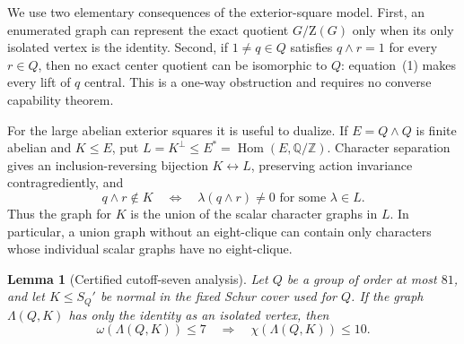 \documentclass[11pt]{article}
\newtheorem{lemma}[theorem]{Lemma}
\theoremstyle{remark}
\newcommand{\Z}{\mathrm Z}
\begin{document}
We use two elementary consequences of the exterior-square model.  First, an
enumerated graph can represent the exact quotient $G/\Z(G)$ only when its
only isolated vertex is the identity.  Second, if $1\ne q\in Q$ satisfies
$q\wedge r=1$ for every $r\in Q$, then no exact center quotient can be
isomorphic to $Q$: equation~(1) makes every lift of $q$ central.  This is a
one-way obstruction and requires no converse capability theorem.

For the large abelian exterior squares it is useful to dualize.  If
$E=Q\wedge Q$ is finite abelian and $K\le E$, put
$L=K^\perp\le E^*=\operatorname{Hom}(E,\mathbb Q/\mathbb Z)$.  Character
separation gives an inclusion-reversing bijection $K\leftrightarrow L$,
preserving action invariance contragrediently, and
\[
 q\wedge r\notin K
 \quad\Longleftrightarrow\quad
 \lambda(q\wedge r)\ne0\text{ for some }\lambda\in L.       \tag{4}
\]
Thus the graph for $K$ is the union of the scalar character graphs in $L$.
In particular, a union graph without an eight-clique can contain only
characters whose individual scalar graphs have no eight-clique.

\begin{lemma}[Certified cutoff-seven analysis]\label{lem:h7-enumeration}
Let $Q$ be a group of order at most $81$, and let $K\le S_Q'$ be normal in
the fixed Schur cover used for $Q$.  If the graph $\Lambda(Q,K)$ has only
the identity as an isolated vertex, then
\[
 \omega(\Lambda(Q,K))\le7\quad\Longrightarrow\quad
 \chi(\Lambda(Q,K))\le10.                                  \tag{5}
\]
\end{lemma}
\end{document}
